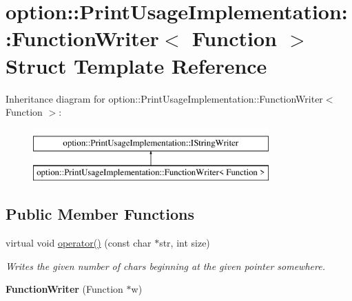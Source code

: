 \hypertarget{structoption_1_1_print_usage_implementation_1_1_function_writer}{}\section{option\+:\+:Print\+Usage\+Implementation\+:\+:Function\+Writer$<$ Function $>$ Struct Template Reference}
\label{structoption_1_1_print_usage_implementation_1_1_function_writer}
Inheritance diagram for option\+:\+:Print\+Usage\+Implementation\+:\+:Function\+Writer$<$ Function $>$\+:\begin{figure}[H]
\begin{center}
\leavevmode
\includegraphics[height=2.000000cm]{structoption_1_1_print_usage_implementation_1_1_function_writer}
\end{center}
\end{figure}
\subsection*{Public Member Functions}
\begin{DoxyCompactItemize}
\item 
\mbox{\label{structoption_1_1_print_usage_implementation_1_1_function_writer_aa8e8f237845e210e36ca431d7e503a70}} 
virtual void \hyperlink{structoption_1_1_print_usage_implementation_1_1_function_writer_aa8e8f237845e210e36ca431d7e503a70}{operator()} (const char $\ast$str, int size)
\begin{DoxyCompactList}\small\item\em Writes the given number of chars beginning at the given pointer somewhere. \end{DoxyCompactList}\item 
\mbox{\label{structoption_1_1_print_usage_implementation_1_1_function_writer_adc6c3f7ba11b3cad65c018955bab47e5}} 
{\bfseries Function\+Writer} (Function $\ast$w)
\end{DoxyCompactItemize}
